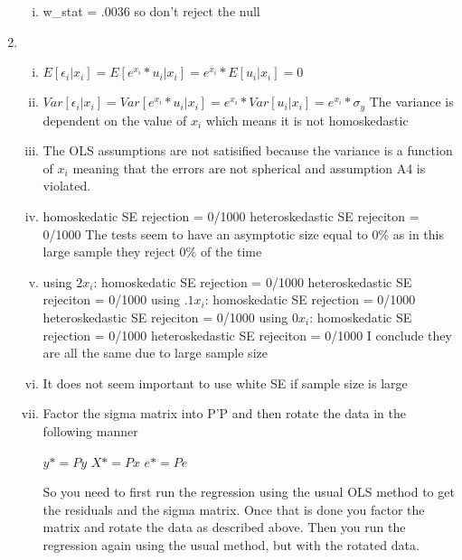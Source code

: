 \documentclass{article}
\begin{document}
\begin{enumerate}
\begin{enumerate}[i)]
				\item w\_stat = .0036 so don't reject the null
			\end{enumerate}
			\item
			\begin{enumerate}[i)]
				\item $E[\epsilon_i|x_i]=E[e^{x_i}*u_i|x_i]=e^{x_{i}}*E[u_i|x_i]=0$
				\item $Var[\epsilon_i|x_i]=Var[e^{x_i}*u_i|x_i] = e^{x_{i}}*Var[u_i|x_i]=e^{x_i}*\sigma_y$
				\newline
				The variance is dependent on the value of $x_i$ which means it is not homoskedastic
				\item The OLS assumptions are not satisified because the variance is a function of $x_i$ meaning that the errors are not spherical and assumption A4 is violated.
				\item homoskedatic SE rejection = 0/1000 \newline
				heteroskedastic SE rejeciton = 0/1000 \newline
				The tests seem to have an asymptotic size equal to 0\% as in this large sample they reject 0\% of the time
				\item using $2x_i$: \newline
				homoskedatic SE rejection = 0/1000 \newline
				heteroskedastic SE rejeciton = 0/1000 \newline
				\newline
				using $.1x_i$: \newline
				homoskedatic SE rejection = 0/1000 \newline
				heteroskedastic SE rejeciton = 0/1000 \newline
				\newline
				using $0x_i$: \newline
				homoskedatic SE rejection = 0/1000 \newline
				heteroskedastic SE rejeciton = 0/1000 \newline
				\newline
				I conclude they are all the same due to large sample size
				\item It does not seem important to use white SE if sample size is large
				\item Factor the sigma matrix into P'P and then rotate the data in the following manner \newline
				
				$y* = Py$ \newline
				$X* = Px$ \newline
				$e* = Pe$ \newline
				
				So you need to first run the regression using the usual OLS method to get the residuals and the sigma matrix. Once that is done you factor the matrix and rotate the data as described above. Then you run the regression again using the usual method, but with the rotated data.
			\end{enumerate}
	\end{enumerate}
\end{document}
